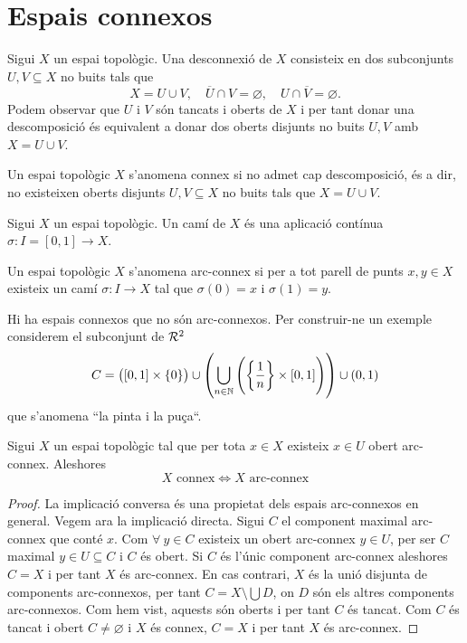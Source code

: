 \section{Espais connexos}

\begin{defi}
	Sigui $X$ un espai topològic. Una desconnexió de $X$ consisteix en dos
	subconjunts $U, V \subseteq X$ no buits tals que
	\[
		X = U \cup V, \quad \overline{U} \cap V = \varnothing, \quad U \cap
		\overline{V} = \varnothing.
	\]
	Podem observar que $U$ i $V$ són tancats i oberts de $X$ i per tant
	donar una descomposició \'es equivalent a donar dos oberts disjunts no buits
	$U, V$ amb $X = U \cup V$.
\end{defi}

\begin{defi}
	Un espai topològic $X$ s'anomena connex si no admet cap descomposició, és
	a dir, no existeixen oberts disjunts $U, V \subseteq X$ no buits tals que
	$X = U \cup V$.
\end{defi}

\begin{defi}
	Sigui $X$ un espai topològic. Un camí de $X$ \'es una aplicació contínua
	$\sigma : I = [0, 1] \longrightarrow X$.
\end{defi}

\begin{defi}
	Un espai topològic $X$ s'anomena arc-connex si per a tot parell de punts
	$x, y \in X$ existeix un camí $\sigma: I \longrightarrow X$ tal que $\sigma(0)
	= x$ i $\sigma(1) = y$.
\end{defi}

\begin{example}
	Hi ha espais connexos que no són arc-connexos. Per construir-ne un exemple
	considerem el subconjunt de $\mathcal{R}^2$
	\[ 
		C = \left([0, 1] \times \{0\}\right) \cup \left( 
		\bigcup \limits_{n \in \mathbb{N}} \left( \left\{  \frac{1}{n} \right\} 
		\times [0, 1] \right) \right) \cup \left( 0, 1\right)
	\]
	que s'anomena ``la pinta i la puça``.
\end{example}
\begin{prop}
	Sigui $X$ un espai topològic tal que per tota $x \in X$ existeix $x \in U$
	obert arc-connex. Aleshores 
	\[X \text{ connex} \iff X \text{ arc-connex}\]
\end{prop}

\begin{proof}
	La implicació conversa \'es una propietat dels espais arc-connexos en general.
	Vegem ara la implicació directa. Sigui $C$ el component maximal arc-connex 
	que conté $x$. Com $\forall \: y \in C$ existeix un obert arc-connex $y \in
	U$, per ser $C$ maximal $y \in U \subseteq C$ i $C$ \'es obert. Si $C$
	és l'únic component arc-connex aleshores $C = X$ i per tant $X$ és arc-connex.
	En cas contrari, $X$ és la unió disjunta de components arc-connexos, per tant
	$C = X \setminus \bigcup D$, on $D$ són els altres components arc-connexos.
	Com hem vist, aquests són oberts i per tant $C$ és tancat. Com $C$ és tancat
	i obert $C \neq \varnothing$ i $X$ és connex, $C = X$ i per tant $X$ és
	arc-connex.
\end{proof}

